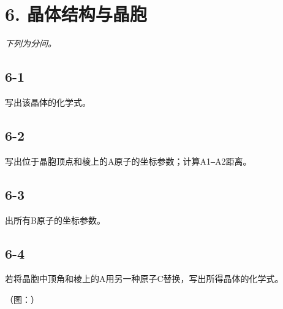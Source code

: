 \section*{6. 晶体结构与晶胞}
\textit{下列为分问。}

\subsection*{6-1}
写出该晶体的化学式。

\subsection*{6-2}
写出位于晶胞顶点和棱上的A原⼦的坐标参数；计算A1‒A2距离。

\subsection*{6-3}
出所有B原⼦的坐标参数。

\subsection*{6-4}
若将晶胞中顶⻆和棱上的A⽤另⼀种原⼦C替换，写出所得晶体的化学式。

（图：）
